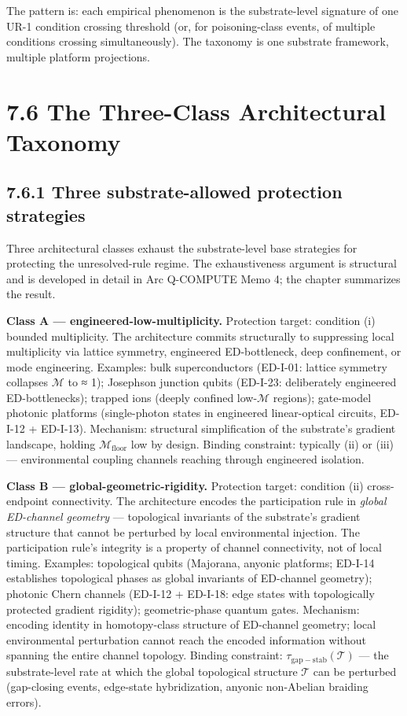 \documentclass[11pt]{book}
\begin{document}
The pattern is: each empirical phenomenon is the substrate-level signature of one UR-1 condition crossing threshold (or, for poisoning-class events, of multiple conditions crossing simultaneously). The taxonomy is one substrate framework, multiple platform projections.

\section{7.6 The Three-Class Architectural Taxonomy}

\subsection{7.6.1 Three substrate-allowed protection strategies}

Three architectural classes exhaust the substrate-level base strategies for protecting the unresolved-rule regime. The exhaustiveness argument is structural and is developed in detail in Arc Q-COMPUTE Memo 4; the chapter summarizes the result.

\textbf{Class A — engineered-low-multiplicity.} Protection target: condition (i) bounded multiplicity. The architecture commits structurally to suppressing local multiplicity via lattice symmetry, engineered ED-bottleneck, deep confinement, or mode engineering. Examples: bulk superconductors (ED-I-01: lattice symmetry collapses $\mathcal{M}$ to ≈ 1); Josephson junction qubits (ED-I-23: deliberately engineered ED-bottlenecks); trapped ions (deeply confined low-$\mathcal{M}$ regions); gate-model photonic platforms (single-photon states in engineered linear-optical circuits, ED-I-12 + ED-I-13). Mechanism: structural simplification of the substrate's gradient landscape, holding $\mathcal{M}_\mathrm{floor}$ low by design. Binding constraint: typically (ii) or (iii) — environmental coupling channels reaching through engineered isolation.

\textbf{Class B — global-geometric-rigidity.} Protection target: condition (ii) cross-endpoint connectivity. The architecture encodes the participation rule in \textit{global ED-channel geometry} — topological invariants of the substrate's gradient structure that cannot be perturbed by local environmental injection. The participation rule's integrity is a property of channel connectivity, not of local timing. Examples: topological qubits (Majorana, anyonic platforms; ED-I-14 establishes topological phases as global invariants of ED-channel geometry); photonic Chern channels (ED-I-12 + ED-I-18: edge states with topologically protected gradient rigidity); geometric-phase quantum gates. Mechanism: encoding identity in homotopy-class structure of ED-channel geometry; local environmental perturbation cannot reach the encoded information without spanning the entire channel topology. Binding constraint: $\tau_\mathrm{gap-stab}(\mathcal{T})$ — the substrate-level rate at which the global topological structure $\mathcal{T}$ can be perturbed (gap-closing events, edge-state hybridization, anyonic non-Abelian braiding errors).
\end{document}
